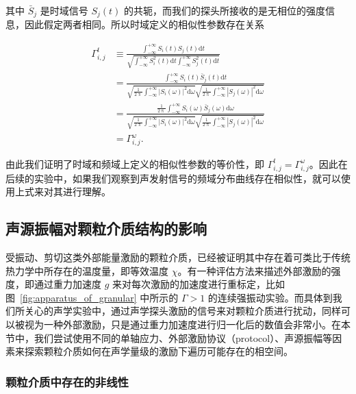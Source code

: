 其中 $\bar{S}_{j}$ 是时域信号 $S_{j}(t)$ 的共轭，而我们的探头所接收的是无相位的强度信息，因此假定两者相同。所以时域定义的相似性参数存在关系

\begin{equation}
  \begin{aligned}
    \Gamma_{i,j}^{t} &\equiv \frac{\int_{-\infty}^{+\infty}S_{i}(t)S_{j}(t)\mathrm{d}t}{\sqrt{\int_{-\infty}^{+\infty}S_{i}^{2}(t)\mathrm{d}t\int_{-\infty}^{+\infty}S_{j}^{2}(t)\mathrm{d}t}}\\
    &= \frac{\int_{-\infty}^{+\infty}S_{i}(t)\bar{S}_{j}(t)\mathrm{d}t}{\sqrt{\frac{1}{2\uppi}\int_{-\infty}^{+\infty}|S_{i}(\omega)|^{2}\mathrm{d}\omega}\sqrt{\frac{1}{2\uppi}\int_{-\infty}^{+\infty}|S_{j}(\omega)|^{2}\mathrm{d}\omega}}\\
    &= \frac{\frac{1}{2\uppi}\int_{-\infty}^{+\infty}S_{i}(\omega)\bar{S}_{j}(\omega)\mathrm{d}\omega}{\sqrt{\frac{1}{2\uppi}\int_{-\infty}^{+\infty}|S_{i}(\omega)|^{2}\mathrm{d}\omega}\sqrt{\frac{1}{2\uppi}\int_{-\infty}^{+\infty}|S_{j}(\omega)|^{2}\mathrm{d}\omega}}\\
    &= \Gamma_{i,j}^{\omega}.
  \end{aligned}
\end{equation}

由此我们证明了时域和频域上定义的相似性参数的等价性，即 $\Gamma_{i,j}^{t}=\Gamma_{i,j}^{\omega}$。因此在后续的实验中，如果我们观察到声发射信号的频域分布曲线存在相似性，就可以使用上式来对其进行理解。

\subsection{声源振幅对颗粒介质结构的影响}

受振动、剪切这类外部能量激励的颗粒介质，已经被证明其中存在着可类比于传统热力学中所存在的温度量，即等效温度 $\chi$。有一种评估方法来描述外部激励的强度，即通过重力加速度 $g$ 来对每次激励的加速度进行重标定，比如图~\ref{fig:apparatus_of_granular} 中所示的 $\Gamma>1$ 的连续强振动实验。而具体到我们所关心的声学实验中，通过声学探头激励的信号来对颗粒介质进行扰动，同样可以被视为一种外部激励，只是通过重力加速度进行归一化后的数值会非常小。在本节中，我们尝试使用不同的单轴应力、外部激励协议（protocol）、声源振幅等因素来探索颗粒介质如何在声学量级的激励下遍历可能存在的相空间。


\subsubsection{颗粒介质中存在的非线性}

